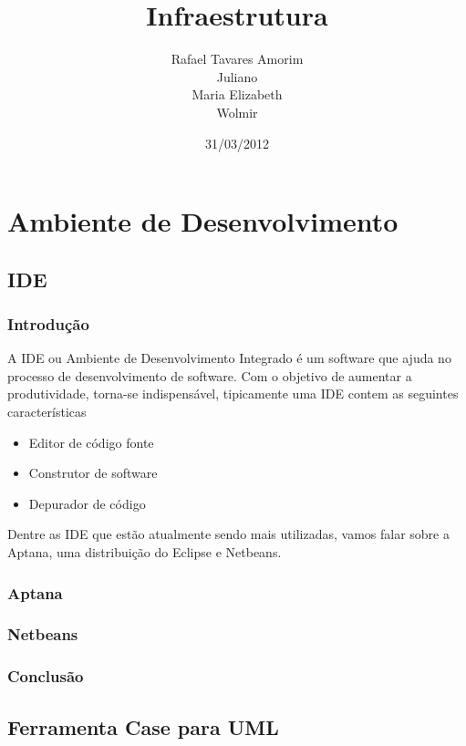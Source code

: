 \documentclass[12pt,a4paper]{article}
\begin{document}
\title{Infraestrutura}
\author{
Rafael Tavares Amorim \\
Juliano \\
Maria Elizabeth \\
Wolmir 
}
\date{31/03/2012}
\maketitle
\thispagestyle{empty}
\clearpage
\tableofcontents
\thispagestyle{empty}
\clearpage
\section{Ambiente de Desenvolvimento}
	\subsection{IDE}
		\subsubsection{Introdução}

				A IDE ou Ambiente de Desenvolvimento Integrado é um software que ajuda no
				processo de desenvolvimento de software. Com o objetivo de aumentar a
				produtividade, torna-se indispensável, tipicamente uma IDE contem as
				seguintes características
				\begin{itemize}
					\item Editor de código fonte
					\item Construtor de software
					\item Depurador de código
				\end{itemize}
				
				Dentre as IDE que estão atualmente sendo mais utilizadas, vamos falar sobre
				a Aptana, uma distribuição do Eclipse e Netbeans.
		
		\subsubsection{Aptana}
		
		\subsubsection{Netbeans}
		
		\subsubsection{Conclusão}


	\subsection{Ferramenta Case para UML}
\end{document}
